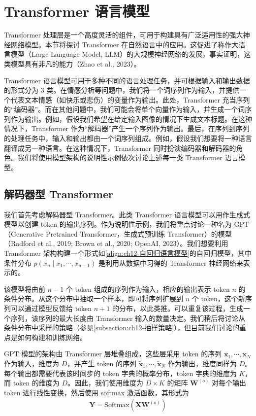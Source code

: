 \documentclass[../../main.tex]{subfiles}
\begin{document}
\section{Transformer 语言模型}\label{section:ch12-Transformer语言模型}

Transformer 处理层是一个高度灵活的组件，可用于构建具有广泛适用性的强大神经网络模型。本节将探讨 Transformer 在自然语言中的应用。这促进了称作大语言模型（Large Language Model, LLM）的大规模神经网络的发展，事实证明，这类模型具有非凡的能力（Zhao et al., 2023）。

Transformer 语言模型可用于多种不同的语言处理任务，并可根据输入和输出数据的形式分为 3 类。在情感分析等问题中，我们将一个词序列作为输入，并提供一个代表文本情感（如快乐或悲伤）的变量作为输出。此处，Transformer 充当序列的“编码器”。而在其他问题中，我们可能会将单个向量作为输入，并生成一个词序列作为输出。例如，假设我们希望在给定输入图像的情况下生成文本标题。在这种情况下，Transformer 作为“解码器”产生一个序列作为输出。最后，在序列到序列的处理任务中，输入和输出都由一个词序列组成。例如，假设我们想要将一种语言翻译成另一种语言。在这种情况下，Transformer 同时扮演编码器和解码器的角色。我们将使用模型架构的说明性示例依次讨论上述每一类 Transformer 语言模型。

\subsection{解码器型 Transformer}\label{subsection:ch12-解码器型Transformer}

我们首先考虑解码器型 Transformer。此类 Transformer 语言模型可以用作生成式模型以创建 token 的输出序列。作为说明性示例，我们将重点讨论一种名为 GPT（Generative Pretrained Transformer，生成式预训练 Transformer）的模型（Radford et al., 2019; Brown et al., 2020; OpenAI, 2023）。我们想要利用 Transformer 架构构建一个形式如\eqref{align:ch12-自回归语言模型}的自回归模型，其中条件分布 $p(x_n\mid x_1,\cdots,x_{n-1})$ 是利用从数据中习得的 Transformer 神经网络来表示的。

该模型将由前 $n-1$ 个 token 组成的序列作为输入，相应的输出表示 token $n$ 的条件分布。从这个分布中抽取一个样本，即可将序列扩展到 $n$ 个 token，这个新序列可以通过模型反馈给 token $n+1$ 的分布，以此类推。可以重复该过程，生成一个序列，该序列的最大长度由 Transformer 输入的数量决定。我们稍后将讨论从条件分布中采样的策略（参见\cref{subsection:ch12-抽样策略}），但目前我们讨论的重点是如何构建和训练网络。

GPT 模型的架构由 Transformer 层堆叠组成，这些层采用 token 的序列 $\mathbf{x}_1,\cdots,\mathbf{x}_N$ 作为输入，维度为 $D$，并产生 token 的序列 $\tilde{\mathbf{x}}_1,\cdots,\tilde{\mathbf{x}}_N$ 作为输出，维度同样为 $D$。每个输出都需要代表该时间步的 token 字典的概率分布，token 字典的维度为 $K$，而 token 的维度为 $D$。因此，我们使用维度为 $D\times K$ 的矩阵 $\mathbf{W}^{(o)}$ 对每个输出 token 进行线性变换，然后使用 softmax 激活函数，其形式为
\begin{align}
\mathbf{Y}=\mathrm{Softmax}\left(\tilde{\mathbf{X}}\mathbf{W}^{(o)}\right)
\label{align:ch12-语言模型输出}
\end{align}
\end{document}

